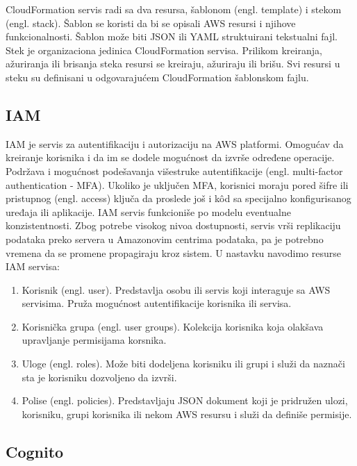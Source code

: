 \documentclass[12pt,oneside]{memoir}
\begin{document}
CloudFormation servis radi sa dva resursa, šablonom (engl. template) i stekom (engl. stack). Šablon se koristi da bi se opisali AWS resursi i njihove funkcionalnosti. Šablon može biti JSON ili YAML struktuirani tekstualni fajl. Stek je organizaciona jedinica CloudFormation servisa. Prilikom kreiranja, ažuriranja ili brisanja steka resursi se kreiraju, ažuriraju ili brišu. Svi resursi u steku su definisani u odgovarajućem CloudFormation šablonskom fajlu.
 
\subsection{IAM}
 
IAM je servis za autentifikaciju i autorizaciju na AWS platformi. Omogućav da kreiranje korisnika i da im se dodele mogućnost da izvrše određene operacije. Podržava i mogućnost podešavanja višestruke autentifikacije (engl. multi-factor authentication - MFA). Ukoliko je uključen MFA, korisnici moraju pored šifre ili pristupnog (engl. access) ključa da proslede još i kôd sa specijalno konfigurisanog uređaja ili aplikacije. IAM servis funkcioniše po modelu eventualne konzistentnosti. Zbog potrebe visokog nivoa dostupnosti, servis vrši replikaciju podataka preko servera u Amazonovim centrima podataka, pa je potrebno vremena da se promene propagiraju kroz sistem. U nastavku navodimo resurse IAM servisa:
\begin{enumerate}
  \item Korisnik (engl. user). Predstavlja osobu ili servis koji interaguje sa AWS servisima. Pruža mogućnost autentifikacije korisnika ili servisa.
  \item Korisnička grupa (engl. user groups). Kolekcija korisnika koja olakšava upravljanje permisijama korsnika.
  \item Uloge (engl. roles). Može biti dodeljena korisniku ili grupi i služi da naznači sta je korisniku dozvoljeno da izvrši.
  \item Polise (engl. policies). Predstavljaju JSON dokument koji je pridružen ulozi, korisniku, grupi korisnika ili nekom AWS resursu i služi da definiše permisije.
\end{enumerate}

\subsection{Cognito}
 
\end{document}
